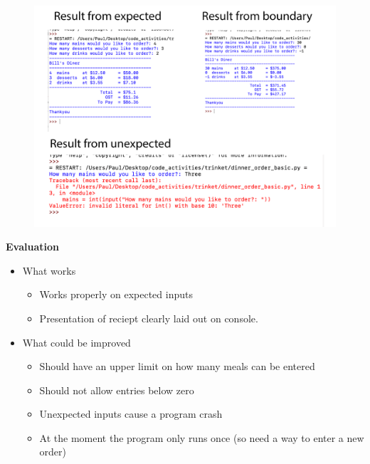 \documentclass[a4paper,12pt]{article}
\begin{document}
\begin{figure} [!h]
	\centering
	\includegraphics[width=16cm]{iterative_processes/Testing.png}
\end{figure}
\newpage
\textbf{Evaluation}
\begin{itemize}
	\item What works 
\begin{itemize}
	\item Works properly on expected inputs
	\item Presentation of reciept clearly laid out on console.
\end{itemize}
	\item What could be improved
\begin{itemize}
	\item Should have an upper limit on how many meals can be entered
	\item Should not allow entries below zero
	\item Unexpected inputs cause a program crash
	\item At the moment the program only runs once (so need a way to enter a new order)
\end{itemize}
\end{itemize}
\newpage
\end{document}
